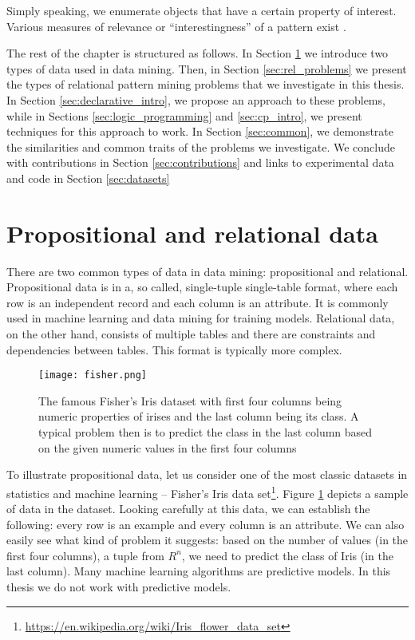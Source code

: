 Simply speaking, we enumerate objects that have a certain property of
interest. Various measures of relevance or ``interestingness'' of a pattern exist \parencite{tias_topk}.

The rest of the chapter is structured as follows. In Section
\ref{sec:data} we introduce two types of data used in data mining.
Then, in Section \ref{sec:rel_problems} we present the types of relational pattern
mining problems that we investigate in this thesis. In Section
\ref{sec:declarative_intro}, we propose an approach to these problems,
while in Sections \ref{sec:logic_programming} and \ref{sec:cp_intro},
we present techniques for this approach to work. In Section
\ref{sec:common}, we demonstrate the similarities and common traits of the
problems we investigate. We conclude with contributions in Section
\ref{sec:contributions} and links to experimental data and code in
Section \ref{sec:datasets}


\section{Propositional and relational data}\label{sec:data}
There are two common types of data in data mining: propositional and
relational. Propositional data is in a, so called, single-tuple
single-table format, where each row is an independent record and each
column is an attribute. It is commonly used in machine learning and data mining for training
models. Relational data, on the other hand, consists of  multiple
tables and there are constraints and dependencies between tables. This format is typically
more complex.

\pubrev
\begin{figure}[thb]
  \begin{center}
    \texttt{[image: fisher.png]}
  \end{center}
  \caption{The famous Fisher's Iris dataset with first four columns
    being numeric properties of irises and the last column being its
    class. A typical problem then is to predict the class in the last
    column based on the given numeric values in the first four columns}
  \label{fig:iris}
\end{figure}


To illustrate propositional data, let us consider one of the most
classic datasets in statistics and machine learning -- Fisher's Iris
data set\footnote{\url{https://en.wikipedia.org/wiki/Iris_flower_data_set}}.
Figure \ref{fig:iris} depicts a sample of data in the
dataset. Looking carefully at this data, we can establish the
following: every row is an example and every column is an attribute.
We can also easily see what kind of problem it suggests:
based on the number of values (in the first four columns), a tuple from $R^n$, we need to predict
the class of Iris (in the last column). Many machine learning algorithms
are predictive models. In this thesis we do not work with predictive models.

